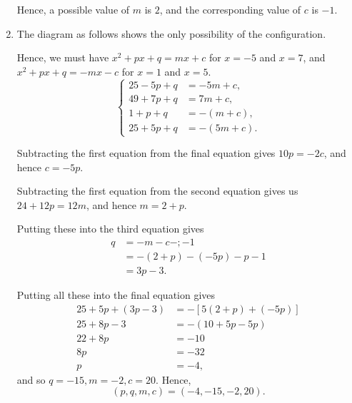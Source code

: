 \begin{enumerate}
          Hence, a possible value of \(m\) is \(2\), and the corresponding value of \(c\) is \(-1\).

    \item The diagram as follows shows the only possibility of the configuration.

          \begin{center}
              
          \end{center}

          Hence, we must have \(x^2 + px + q = mx + c\) for \(x = -5\) and \(x = 7\), and \(x^2 + px + q = -mx - c\) for \(x = 1\) and \(x = 5\).
          \[
              \left\{
              \begin{aligned}
                  25 - 5p + q & = -5m + c,    \\
                  49 + 7p + q & = 7m + c,     \\
                  1 + p + q   & = - (m + c),  \\
                  25 + 5p + q & = - (5m + c).
              \end{aligned}
              \right.
          \]

          Subtracting the first equation from the final equation gives \(10 p = -2c\), and hence \(c = -5p\).

          Subtracting the first equation from the second equation gives us \(24 + 12 p = 12 m\), and hence
          \(m = 2 + p\).

          Putting these into the third equation gives
          \begin{align*}
              q & = -m - c - ; - 1            \\
                & = - (2 + p) - (-5p) - p - 1 \\
                & = 3p - 3.
          \end{align*}

          Putting all these into the final equation gives
          \begin{align*}
              25 + 5p + (3p - 3) & = - \left[5 (2 + p) + (-5p)\right] \\
              25 + 8p - 3        & = - (10 + 5p - 5p)                 \\
              22 + 8p            & = -10                              \\
              8p                 & = -32                              \\
              p                  & = -4,
          \end{align*}
          and so \(q = -15, m = -2, c = 20\). Hence,
          \[
              (p, q, m, c) = (-4, -15, -2, 20).
          \]
\end{enumerate}